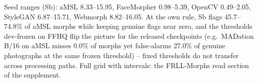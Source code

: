 \begin{table}[t]
\begin{tabular}{lrrrrr}
    \bottomrule
    \end{tabular}
    \par\smallskip\raggedright
    Seed ranges (Sb): aMSL 8.33--15.95, FaceMorpher 0.98--5.39, OpenCV 0.49--2.05, StyleGAN 6.87--15.71, Webmorph 8.82--16.05. At the own rule, Sb flags 45.7--74.8\% of aMSL morphs while keeping genuine flags near zero, and the thresholds dev-frozen on FFHQ flip the picture for the released checkpoints (e.g.\ MADation B/16 on aMSL misses 0.0\% of morphs yet false-alarms 27.0\% of genuine photographs at the same frozen threshold) -- fixed thresholds do not transfer across processing paths. Full grid with intervals: the FRLL-Morphs read section of the supplement.
    \end{table}
    